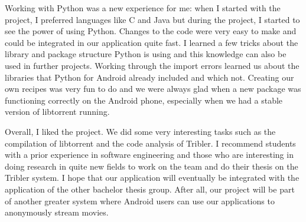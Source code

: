 	  	Working with Python was a new experience for me: when I started with the project, I preferred languages like C and Java but during the project, I started to see the power of using Python. Changes to the code were very easy to make and could be integrated in our application quite fast. I learned a few tricks about the library and package structure Python is using and this knowledge can also be used in further projects. Working through the import errors learned us about the libraries that Python for Android already included and which not. Creating our own recipes was very fun to do and we were always glad when a new package was functioning correctly on the Android phone, especially when we had a stable version of libtorrent running.
	 	
	 	Overall, I liked the project. We did some very interesting tasks such as the compilation of libtorrent and the code analysis of Tribler. I recommend students with a prior experience in software engineering and those who are interesting in doing research in quite new fields to work on the team and do their thesis on the Tribler system. I hope that our application will eventually be integrated with the application of the other bachelor thesis group. After all, our project will be part of another greater system where Android users can use our applications to anonymously stream movies.
